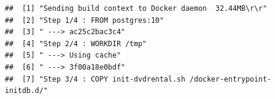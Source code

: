 \documentclass[]{book}
\theoremstyle{definition}
\theoremstyle{definition}
\theoremstyle{definition}
\theoremstyle{remark}
\begin{document}
\begin{verbatim}
##  [1] "Sending build context to Docker daemon  32.44MB\r\r"                                                                                                                                                                                                                                                                                                                                           
##  [2] "Step 1/4 : FROM postgres:10"                                                                                                                                                                                                                                                                                                                                                                   
##  [3] " ---> ac25c2bac3c4"                                                                                                                                                                                                                                                                                                                                                                            
##  [4] "Step 2/4 : WORKDIR /tmp"                                                                                                                                                                                                                                                                                                                                                                       
##  [5] " ---> Using cache"                                                                                                                                                                                                                                                                                                                                                                             
##  [6] " ---> 3f00a18e0bdf"                                                                                                                                                                                                                                                                                                                                                                            
##  [7] "Step 3/4 : COPY init-dvdrental.sh /docker-entrypoint-initdb.d/"                                                                                                                                                                                                                                                                                                                                

\end{verbatim}
\end{document}
